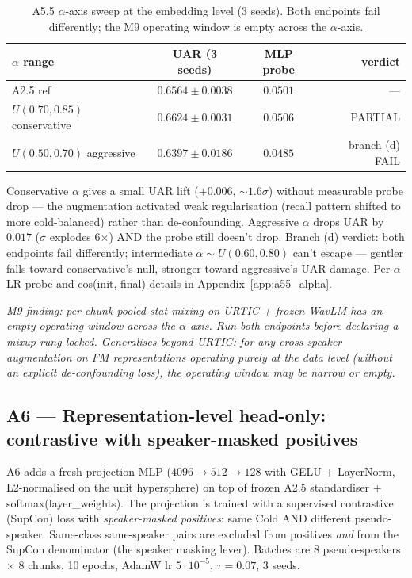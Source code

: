 \begin{table}[t]
\centering\small
\caption{A5.5 $\alpha$-axis sweep at the embedding level (3 seeds). Both endpoints fail differently; the M9 operating window is empty across the $\alpha$-axis.}
\label{tab:a55_alpha}
\begin{tabular}{lccr}
\toprule
$\alpha$ range & UAR (3 seeds) & MLP probe & verdict \\
\midrule
A2.5 ref       & $0.6564 \pm 0.0038$ & $0.0501$ & --- \\
$U(0.70, 0.85)$ conservative & $0.6624 \pm 0.0031$ & $0.0506$ & PARTIAL \\
$U(0.50, 0.70)$ aggressive   & $0.6397 \pm 0.0186$ & $0.0485$ & branch (d) FAIL \\
\bottomrule
\end{tabular}
\end{table}

Conservative $\alpha$ gives a small UAR lift ($+0.006$, $\sim 1.6\sigma$) without measurable probe drop --- the augmentation activated weak regularisation (recall pattern shifted to more cold-balanced) rather than de-confounding. Aggressive $\alpha$ drops UAR by $0.017$ ($\sigma$ explodes 6$\times$) AND the probe still doesn't drop. Branch (d) verdict: both endpoints fail differently; intermediate $\alpha \sim U(0.60, 0.80)$ can't escape --- gentler falls toward conservative's null, stronger toward aggressive's UAR damage. Per-$\alpha$ LR-probe and cos(init, final) details in Appendix~\ref{app:a55_alpha}.

\textit{M9 finding:} \emph{per-chunk pooled-stat mixing on URTIC + frozen WavLM has an empty operating window across the $\alpha$-axis. Run both endpoints before declaring a mixup rung locked. Generalises beyond URTIC: for any cross-speaker augmentation on FM representations operating purely at the data level (without an explicit de-confounding loss), the operating window may be narrow or empty.}

\subsection{A6 — Representation-level head-only: contrastive with speaker-masked positives}
\label{ssec:a6}

A6 adds a fresh projection MLP ($4096 \to 512 \to 128$ with GELU + LayerNorm, L2-normalised on the unit hypersphere) on top of frozen A2.5 standardiser + softmax(layer\_weights). The projection is trained with a supervised contrastive (SupCon) loss with \emph{speaker-masked positives}: same Cold AND different pseudo-speaker. Same-class same-speaker pairs are excluded from positives \emph{and} from the SupCon denominator (the speaker masking lever). Batches are 8 pseudo-speakers $\times$ 8 chunks, 10 epochs, AdamW lr $5\cdot 10^{-5}$, $\tau=0.07$, 3 seeds.

